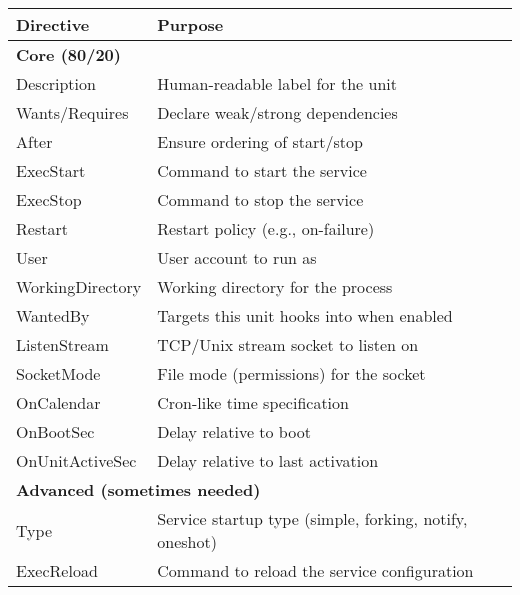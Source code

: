 \documentclass[openany, 12pt]{book}
\begin{document}
\begin{table}
  \begin{center}
    \begin{tabular}{ll}
      \toprule
      \textbf{Directive}  & \textbf{Purpose}                                        \\
      \midrule
      \multicolumn{2}{l}{\textbf{Core (80/20)}}                                     \\
      Description         & Human-readable label for the unit                       \\
      Wants/Requires      & Declare weak/strong dependencies                        \\
      After               & Ensure ordering of start/stop                           \\
      ExecStart           & Command to start the service                            \\
      ExecStop            & Command to stop the service                             \\
      Restart             & Restart policy (e.g., on-failure)                       \\
      User                & User account to run as                                  \\
      WorkingDirectory    & Working directory for the process                       \\
      WantedBy            & Targets this unit hooks into when enabled               \\
      ListenStream        & TCP/Unix stream socket to listen on                     \\
      SocketMode          & File mode (permissions) for the socket                  \\
      OnCalendar          & Cron-like time specification                            \\
      OnBootSec           & Delay relative to boot                                  \\
      OnUnitActiveSec     & Delay relative to last activation                       \\
      \midrule
      \multicolumn{2}{l}{\textbf{Advanced (sometimes needed)}}                      \\
      Type                & Service startup type (simple, forking, notify, oneshot) \\
      ExecReload          & Command to reload the service configuration             \\

\end{tabular}
\end{center}
\end{table}
\end{document}
